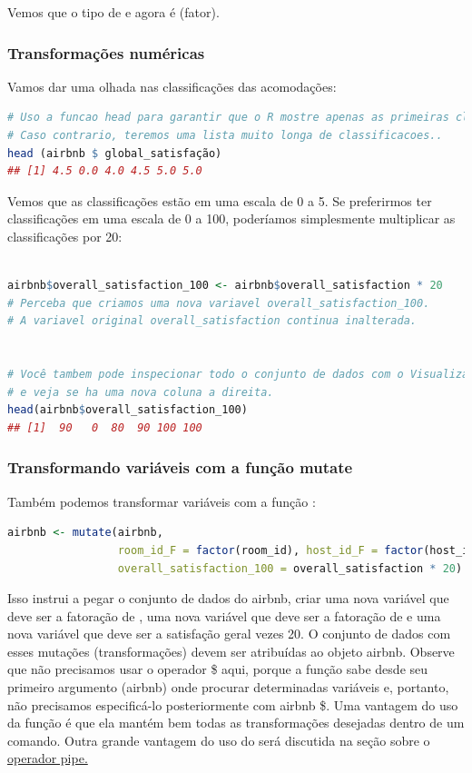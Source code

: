 \documentclass{article}
\begin{document}
Vemos que o tipo de  e  agora é  (fator).

\subsubsection{Transformações numéricas}

Vamos dar uma olhada nas classificações das acomodações:

\begin{lstlisting}[language=R]
# Uso a funcao head para garantir que o R mostre apenas as primeiras classificacoes.
# Caso contrario, teremos uma lista muito longa de classificacoes..
head (airbnb $ global_satisfação)
## [1] 4.5 0.0 4.0 4.5 5.0 5.0
\end{lstlisting}

Vemos que as classificações estão em uma escala de 0 a 5. Se preferirmos ter classificações em uma escala de 0 a 100, poderíamos simplesmente multiplicar as classificações por 20:

\begin{lstlisting}[language=R]

airbnb$overall_satisfaction_100 <- airbnb$overall_satisfaction * 20 
# Perceba que criamos uma nova variavel overall_satisfaction_100.
# A variavel original overall_satisfaction continua inalterada.


# Você tambem pode inspecionar todo o conjunto de dados com o Visualizador
# e veja se ha uma nova coluna a direita.
head(airbnb$overall_satisfaction_100) 
## [1]  90   0  80  90 100 100
\end{lstlisting}


\subsubsection{Transformando variáveis com a função mutate}

Também podemos transformar variáveis com a função :

\begin{lstlisting}[language=R]
airbnb <- mutate(airbnb, 
                 room_id_F = factor(room_id), host_id_F = factor(host_id),
                 overall_satisfaction_100 = overall_satisfaction * 20)
\end{lstlisting}

Isso instrui \faRProject a pegar o conjunto de dados do airbnb, criar uma nova variável  que deve ser a fatoração de , uma nova variável  que deve ser a fatoração de  e uma nova variável  que deve ser a satisfação geral vezes 20. O conjunto de dados com esses mutações (transformações) devem ser atribuídas ao objeto airbnb. Observe que não precisamos usar o operador \$ aqui, porque a função  sabe desde seu primeiro argumento (airbnb) onde procurar determinadas variáveis e, portanto, não precisamos especificá-lo posteriormente com airbnb \$. Uma vantagem do uso da função  é que ela mantém bem todas as transformações desejadas dentro de um comando. Outra grande vantagem do uso do  será discutida na seção sobre o \href{https://bookdown.org/content/1340/pipe.html#pipe}{operador pipe.}
\end{document}
